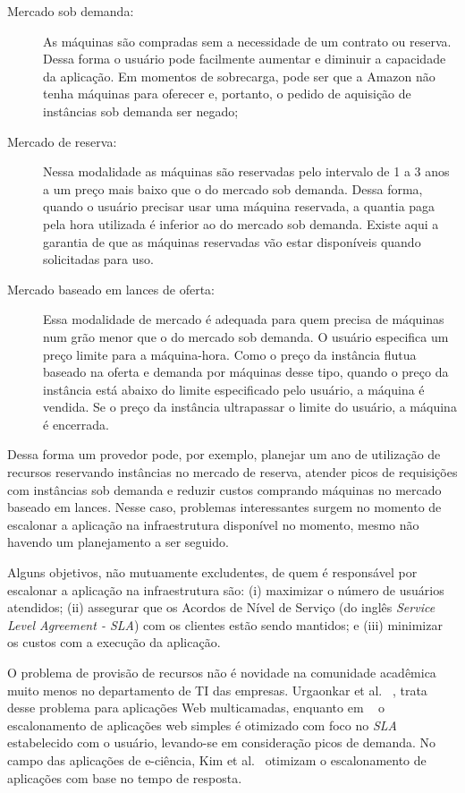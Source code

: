 \documentclass[a4paper,titlepage,12pt]{article}
\begin{document}
\begin{description}
  	\item [Mercado sob demanda:] As máquinas são compradas sem a necessidade de um contrato ou reserva. Dessa forma o usuário pode facilmente aumentar e diminuir a capacidade da aplicação. Em momentos de sobrecarga, pode ser que a Amazon não tenha máquinas para oferecer e, portanto, o pedido de aquisição de instâncias sob demanda ser negado;
    \item [Mercado de reserva:] Nessa modalidade as máquinas são reservadas pelo intervalo de 1 a 3 anos a um preço mais baixo que o do mercado sob demanda. Dessa forma, quando o usuário precisar usar uma máquina reservada, a quantia paga pela hora utilizada é inferior ao do mercado sob demanda. Existe aqui a garantia de que as máquinas reservadas vão estar disponíveis quando solicitadas para uso.  
  	\item [Mercado baseado em lances de oferta:] Essa modalidade de mercado é adequada para quem precisa de máquinas num grão menor que o do mercado sob demanda. O usuário especifica um preço limite para a máquina-hora. Como o preço da instância flutua baseado na oferta e demanda por máquinas desse tipo, quando o preço da instância está abaixo do limite especificado pelo usuário, a máquina é vendida. Se o preço da instância ultrapassar o limite do usuário, a máquina é encerrada.
\end{description}   

Dessa forma um provedor pode, por exemplo, planejar um ano de utilização de recursos reservando instâncias no mercado de reserva, atender picos de requisições com instâncias sob demanda e reduzir custos comprando máquinas no mercado baseado em lances. Nesse caso, problemas interessantes surgem no momento de escalonar a aplicação na infraestrutura disponível no momento, mesmo não havendo um planejamento a ser seguido.

Alguns objetivos, não mutuamente excludentes, de quem é responsável por escalonar a aplicação na infraestrutura são: (i) maximizar o número de usuários atendidos; (ii) assegurar que os Acordos de Nível de Serviço (do inglês \textit{Service Level Agreement - SLA}) com os clientes estão sendo mantidos; e (iii) minimizar os custos com a execução da aplicação. 

O problema de provisão de recursos não é novidade na comunidade acadêmica muito menos no departamento de TI das empresas. Urgaonkar et al. ~\cite{multitier}, trata desse problema para aplicações Web multicamadas, enquanto em ~\cite{sla} o escalonamento de aplicações web simples é otimizado com foco no \textit{SLA} estabelecido com o usuário, levando-se em consideração picos de demanda. No campo das aplicações de e-ciência, Kim et al.~\cite{kim-responsetime} otimizam o escalonamento de aplicações com base no tempo de resposta. 
\end{document}
